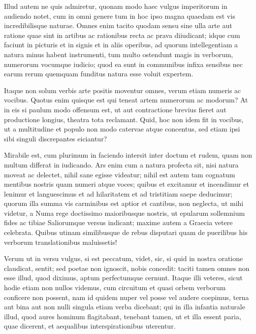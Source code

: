  Illud autem ne quis admiretur, quonam modo haec vulgus imperitorum in audiendo notet, cum in omni genere tum in hoc ipso magna quaedam est vis incredibilisque naturae. Omnes enim tacito quodam sensu sine ulla arte aut ratione quae sint in artibus ac rationibus recta ac prava diiudicant; idque cum faciunt in picturis et in signis et in aliis operibus, ad quorum intellegentiam a natura minus habent instrumenti, tum multo ostendunt magis in verborum, numerorum vocumque iudicio; quod ea sunt in communibus infixa sensibus nec earum rerum quemquam funditus natura esse voluit expertem.

 Itaque non solum verbis arte positis moventur omnes, verum etiam numeris ac vocibus. Quotus enim quisque est qui teneat artem numerorum ac modorum? At in eis si paulum modo offensum est, ut aut contractione brevius fieret aut productione longius, theatra tota reclamant. Quid, hoc non idem fit in vocibus, ut a multitudine et populo non modo catervae atque concentus, sed etiam ipsi sibi singuli discrepantes eiciantur?

 Mirabile est, cum plurimum in faciendo intersit inter doctum et rudem, quam non multum differat in iudicando. Ars enim cum a natura profecta sit, nisi natura moveat ac delectet, nihil sane egisse videatur; nihil est autem tam cognatum mentibus nostris quam numeri atque voces; quibus et excitamur et incendimur et lenimur et languescimus et ad hilaritatem et ad tristitiam saepe deducimur; quorum illa summa vis carminibus est aptior et cantibus, non neglecta, ut mihi videtur, a Numa rege doctissimo maioribusque nostris, ut epularum sollemnium fides ac tibiae Saliorumque versus indicant; maxime autem a Graecia vetere celebrata. Quibus utinam similibusque de rebus disputari quam de puerilibus his verborum translationibus maluissetis!

 Verum ut in versu vulgus, si est peccatum, videt, sic, si quid in nostra oratione claudicat, sentit; sed poetae non ignoscit, nobis concedit: taciti tamen omnes non esse illud, quod diximus, aptum perfectumque cernunt. Itaque illi veteres, sicut hodie etiam non nullos videmus, cum circuitum et quasi orbem verborum conficere non possent, nam id quidem nuper vel posse vel audere coepimus, terna aut bina aut non nulli singula etiam verba dicebant; qui in illa infantia naturale illud, quod aures hominum flagitabant, tenebant tamen, ut et illa essent paria, quae dicerent, et aequalibus interspirationibus uterentur.

